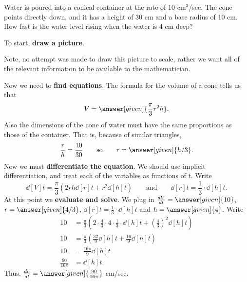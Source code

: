\documentclass{ximera}
\begin{document}
\begin{example}
Water is poured into a conical container at the rate of 10
cm${}^3$/sec.  The cone points directly down, and it has a height of
30 cm and a base radius of 10 cm.  How fast is the water level rising
when the water is 4 cm deep?

\begin{explanation}
To start, \textbf{draw a picture}.
\begin{image}
\end{image}
Note, no attempt was made to draw this picture to scale, rather we
want all of the relevant information to be available to the
mathematician.

Now we need to \textbf{find equations}. The formula for the volume of a cone tells us that 
\[
V = \answer[given]{\frac{\pi}{3} r^2 h}.
\]
Also the dimensions of the cone of water must have the same
proportions as those of the container.  That is, because of similar
triangles,
\[
\frac{r}{h}=\frac{10}{30} \qquad\text{so}\qquad r=\answer[given]{h/3}.
\]  
Now we must \textbf{differentiate the equation}. We should use
implicit differentiation, and treat each of the variables as functions
of $t$. Write
\[
\dd[V]{t} = \frac{\pi}{3}\left(2rh \dd[r]{t} + r^2 \dd[h]{t}\right)
\qquad\text{and}\qquad \dd[r]{t} = \frac{1}{3}\cdot \dd[h]{t}.
\]
At this point we \textbf{evaluate and solve}. We plug in $\dd[V]{t} =
\answer[given]{10}$, $r = \answer[given]{4/3}$, $\dd[r]{t} = \frac{1}{3}\cdot \dd[h]{t}$ and
$h=\answer[given]{4}$. Write
\begin{align*}
10 &= \frac{\pi}{3}\left(2\cdot \frac{4}{3}\cdot 4 \cdot\frac{1}{3}\cdot\dd[h]{t} + \left(\frac{4}{3}\right)^2 \dd[h]{t}\right)\\
10 &= \frac{\pi}{3}\left(\frac{32}{9}\dd[h]{t} + \frac{16}{9} \dd[h]{t}\right)\\
10 &= \frac{16\pi}{9}\dd[h]{t}\\
\frac{90}{16\pi} &= \dd[h]{t}.
\end{align*}
Thus, $\dd[h]{t}=\answer[given]{\frac{90}{16\pi}}$ cm/sec.
\end{explanation}
\end{example}
\end{document}
